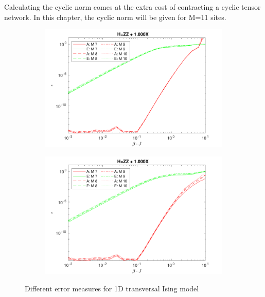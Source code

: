 Calculating the cyclic norm comes at the extra cost of contracting a cyclic tensor network. In this chapter, the cyclic norm will be given for M=11 sites.

\begin{figure}[H]
    \begin{subfigure}[]{\linewidth}
        \includegraphics[width=\textwidth]{Figuren/benchmarking/comp_M_cycl.pdf}
    \end{subfigure}
    \begin{subfigure}[]{\linewidth}
        \includegraphics[width=\textwidth]{Figuren/benchmarking/Comp_M_lin.pdf}
    \end{subfigure}
    \caption{ Different error measures for 1D transversal Ising model }
    \label{benchmarking:systemsize}
\end{figure}

